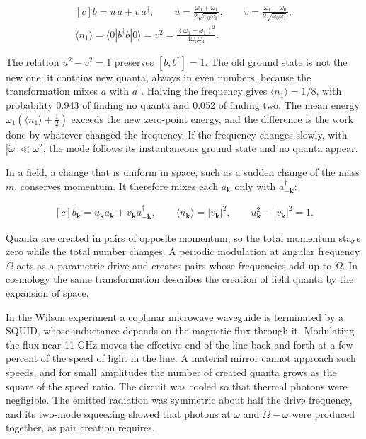 \documentclass[11pt,oneside]{book}
\newenvironment{centeredalign}{\[\begin{gathered}[c]}{\end{gathered}\]}
\begin{document}
\begin{centeredalign}
b=u\,a+v\,a^\dagger,\qquad
u=\frac{\omega_0+\omega_1}{2\sqrt{\omega_0\omega_1}},\qquad
v=\frac{\omega_1-\omega_0}{2\sqrt{\omega_0\omega_1}},\\
\langle n_1\rangle=\langle0|b^\dagger b|0\rangle=v^2=\frac{(\omega_0-\omega_1)^2}{4\omega_0\omega_1}.
\end{centeredalign}

The relation \(u^2-v^2=1\) preserves \([b,b^\dagger]=1\). The old ground state is not the new one: it contains new quanta, always in even numbers, because the transformation mixes \(a\) with \(a^\dagger\). Halving the frequency gives \(\langle n_1\rangle=1/8\), with probability 0.943 of finding no quanta and 0.052 of finding two. The mean energy \(\omega_1(\langle n_1\rangle+\frac12)\) exceeds the new zero-point energy, and the difference is the work done by whatever changed the frequency. If the frequency changes slowly, with \(|\dot\omega|\ll\omega^2\), the mode follows its instantaneous ground state and no quanta appear.

In a field, a change that is uniform in space, such as a sudden change of the mass \(m\), conserves momentum. It therefore mixes each \(a_{\mathbf k}\) only with \(a_{-\mathbf k}^\dagger\):

\begin{centeredalign}
b_{\mathbf k}=u_{\mathbf k}a_{\mathbf k}+v_{\mathbf k}a_{-\mathbf k}^\dagger,\qquad
\langle n_{\mathbf k}\rangle=|v_{\mathbf k}|^2,\qquad
u_{\mathbf k}^2-|v_{\mathbf k}|^2=1.
\end{centeredalign}

Quanta are created in pairs of opposite momentum, so the total momentum stays zero while the total number changes. A periodic modulation at angular frequency \(\Omega\) acts as a parametric drive and creates pairs whose frequencies add up to \(\Omega\). In cosmology the same transformation describes the creation of field quanta by the expansion of space.

In the Wilson experiment a coplanar microwave waveguide is terminated by a SQUID, whose inductance depends on the magnetic flux through it. Modulating the flux near 11 GHz moves the effective end of the line back and forth at a few percent of the speed of light in the line. A material mirror cannot approach such speeds, and for small amplitudes the number of created quanta grows as the square of the speed ratio. The circuit was cooled so that thermal photons were negligible. The emitted radiation was symmetric about half the drive frequency, and its two-mode squeezing showed that photons at \(\omega\) and \(\Omega-\omega\) were produced together, as pair creation requires.
\end{document}
